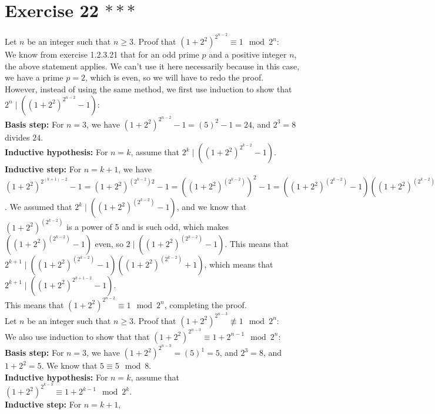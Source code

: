 \documentclass[12pt]{article}
\begin{document}
    \section*{Exercise 22 $***$}
    Let $n$ be an integer such that $n \geqslant 3$.
    Proof that $(1 + 2^2)^{2^{n-2}} \equiv 1 \mod 2^n$: \\ 
    We know from exercise 1.2.3.21 that for
    an odd prime $p$ and a positive integer $n$,
    the above statement applies.
    We can't use it here necessarily because in this case,
    we have a prime $p = 2$, which is even,
    so we will have to redo the proof. \\
    However, instead of using the same method,
    we first use induction to show
    that $2^n \mid ((1 + 2^2)^{2^{n-2}} - 1)$: \\
    \textbf{Basis step:} For $n = 3$,
    we have $(1 + 2^2)^{2^{n-2}} - 1 = (5)^2 - 1 = 24$,
    and $2^3 = 8$ divides $24$. \\
    \textbf{Inductive hypothesis:} For $n = k$,
    assume that $2^k \mid ((1 + 2^2)^{2^{k-2}} - 1)$. \\
    \textbf{Inductive step:} For $n = k + 1$,
    we have $(1 + 2^2)^{2^{(k+1)-2}} - 1 = (1 + 2^2)^{(2^{k-2})2} - 1
    =  ((1 + 2^2)^{(2^{k-2})})^2 - 1
    = ((1 + 2^2)^{(2^{k-2})} - 1)((1 + 2^2)^{(2^{k-2})} + 1)$.
    We assumed that $2^k \mid ((1 + 2^2)^{(2^{k-2})} - 1)$,
    and we know that $(1 + 2^2)^{(2^{k-2})}$ is a power of 5
    and is such odd, which makes $((1 + 2^2)^{(2^{k-2})} - 1)$ even,
    so $2 \mid ((1 + 2^2)^{(2^{k-2})} - 1)$.
    This means that
    $2^{k+1} \mid ((1 + 2^2)^{(2^{k-2})} - 1)((1 + 2^2)^{(2^{k-2})} + 1)$,
    which means that $2^{k+1} \mid ((1 + 2^2)^{2^{k + 1 - 2}} - 1)$. \\
    This means that $(1 + 2^2)^{2^{n-2}} \equiv 1 \mod 2^n$,
    completing the proof. \\
    Let $n$ be an integer such that $n \geqslant 3$.
    Proof that $(1 + 2^2)^{2^{n-3}} \not\equiv 1 \mod 2^n$: \\ 
    We also use induction to show that 
    that $(1 + 2^2)^{2^{n-3}} \equiv 1 + 2^{n-1} \mod 2^n$: \\
    \textbf{Basis step:} For $n = 3$,
    we have $(1 + 2^2)^{2^{n-3}} = (5)^1 = 5$,
    and $2^3 = 8$, and $1 + 2^2 = 5$.
    We know that $5 \equiv 5 \mod 8$. \\
    \textbf{Inductive hypothesis:} For $n = k$,
    assume that $(1 + 2^2)^{2^{k-3}} \equiv 1 + 2^{k-1} \mod 2^k$. \\
    \textbf{Inductive step:} For $n = k + 1$,
\end{document}

